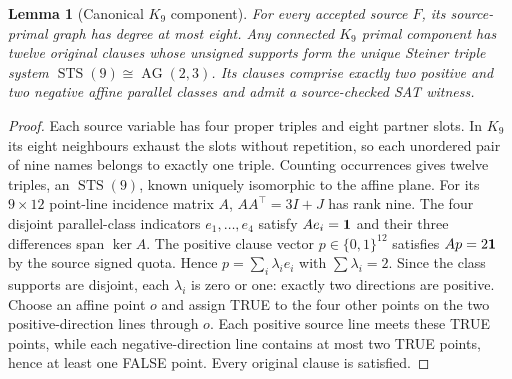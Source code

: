 \documentclass[11pt]{article}
\newtheorem{lemma}{Lemma}
\begin{document}
\begin{lemma}[Canonical $K_9$ component]
For every accepted source $F$, its source-primal graph has degree at most eight. Any connected $K_9$ primal component has twelve original clauses whose unsigned supports form the unique Steiner triple system $\operatorname{STS}(9)\cong\operatorname{AG}(2,3)$. Its clauses comprise exactly two positive and two negative affine parallel classes and admit a source-checked SAT witness.
\end{lemma}
\begin{proof}
Each source variable has four proper triples and eight partner slots. In $K_9$ its eight neighbours exhaust the slots without repetition, so each unordered pair of nine names belongs to exactly one triple. Counting occurrences gives twelve triples, an $\operatorname{STS}(9)$, known uniquely isomorphic to the affine plane. For its $9\times12$ point-line incidence matrix $A$, $AA^\top=3I+J$ has rank nine. The four disjoint parallel-class indicators $e_1,\ldots,e_4$ satisfy $Ae_i={\bf1}$ and their three differences span $\ker A$. The positive clause vector $p\in\{0,1\}^{12}$ satisfies $Ap=2{\bf1}$ by the source signed quota. Hence $p=\sum_i\lambda_i e_i$ with $\sum\lambda_i=2$. Since the class supports are disjoint, each $\lambda_i$ is zero or one: exactly two directions are positive. Choose an affine point $o$ and assign TRUE to the four other points on the two positive-direction lines through $o$. Each positive source line meets these TRUE points, while each negative-direction line contains at most two TRUE points, hence at least one FALSE point. Every original clause is satisfied.
\end{proof}
\end{document}
